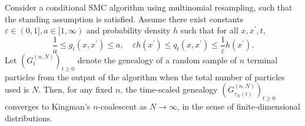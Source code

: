 \begin{corollary}\label{thm:CSMC_newassns}
Consider a conditional SMC algorithm using multinomial resampling, such that the standing assumption is satisfied. Assume there exist constants $\varepsilon\in (0,1], a\in [1,\infty)$ and probability density $h$ such that for all $x, x^\prime, t$,
\begin{equation}\label{eq:gq_bounds_csmc}
\frac{1}{a} \leq g_t(x, x^\prime) \leq a , \quad
\varepsilon h(x^\prime) \leq q_t(x, x^\prime) \leq \frac{1}{\varepsilon} h(x^\prime) .
\end{equation}
Let $(G_t^{(n,N)})_{t\geq0}$ denote the genealogy of a random sample of $n$ terminal particles from the output of the algorithm when the total number of particles used is $N$. Then, for any fixed $n$, the time-scaled genealogy $(G_{\tau_N(t)}^{(n,N)})_{t\geq0}$ converges to Kingman's $n$-coalescent as $N\to \infty$, in the sense of finite-dimensional distributions.
\end{corollary}


